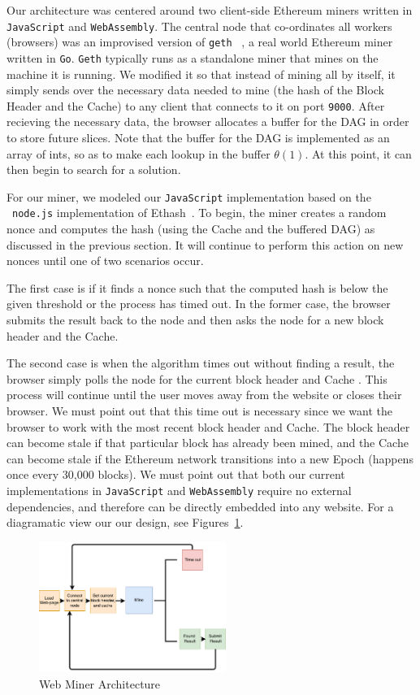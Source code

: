 \documentclass[runningheads]{llncs}
\begin{document}
Our architecture was centered around two client-side Ethereum miners written in \verb|JavaScript| and \verb|WebAssembly|. The central node that co-ordinates all workers (browsers) was an improvised version of \verb|geth| ~\cite{geth}, a real world Ethereum miner written in \verb|Go|. \verb|Geth| typically runs as a standalone miner that mines on the machine it is running. We modified it so that instead of mining all by itself, it simply sends over the necessary data needed to mine (the hash of the Block Header and the Cache) to any client that connects to it on port \verb|9000|. After recieving the necessary data, the browser allocates a buffer for the DAG in order to store future slices. Note that the buffer for the DAG is implemented as an array of ints, so as to make each lookup in the buffer $\theta(1)$. At this point, it can then begin to search for a solution. 

For our miner, we modeled our \verb|JavaScript| implementation based on the ~\verb|node.js| implementation of Ethash~\cite{ethash}. To begin, the miner creates a random nonce and computes the hash (using the Cache and the buffered DAG) as discussed in the previous section. It will continue to perform this action on new nonces until one of two scenarios occur. 

The first case is if it finds a nonce such that the computed hash is below the given threshold or the process has timed out. In the former case, the browser submits the result back to the node and then asks the node for a new block header and the Cache. 

The second case is when the algorithm times out without finding a result, the browser simply polls the node for the current block header and Cache . This process will continue until the user moves away from the website or closes their browser. 
We must point out that this time out is necessary since we want the browser to work with the most recent block header and Cache. The block header can become stale if that particular block has already been mined, and the Cache can become stale if the Ethereum network transitions into a new Epoch (happens once every 30,000 blocks). 
We must point out that both our current implementations in \verb|JavaScript| and \verb|WebAssembly| require no external dependencies, and therefore can be directly embedded into any website. For a diagramatic view our our design, see Figures~\ref{fig:hybridArchitecture}.

\begin{figure}[h]
\centering
\includegraphics[width=230px,keepaspectratio]{Hybrid-Miner.pdf}
\caption{\label{fig:hybridArchitecture} Web Miner Architecture}
\end{figure}
\end{document}
